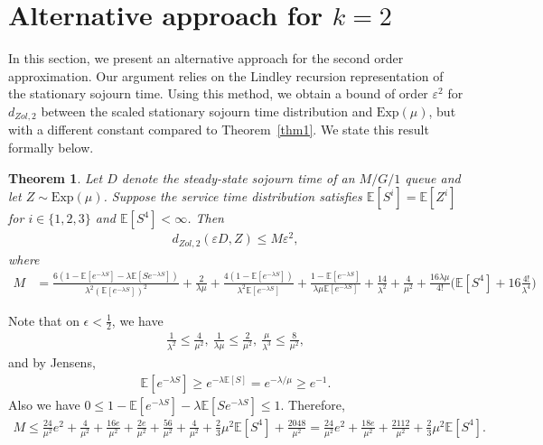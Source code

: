 \documentclass[11pt,letterpaper,reqno]{article}
\theoremstyle{thmstyleone}%
\newtheorem{theorem}{Theorem}%
\theoremstyle{thmstyletwo}%
\theoremstyle{thmstylethree}%
\numberwithin{equation}{section}
\begin{document}
\section{Alternative approach for  $k=2$}\label{sec:altk=2}
In this section, we present an alternative approach for the second order approximation. Our argument relies on the Lindley recursion representation of the stationary sojourn time.
Using this method, we obtain a bound of order $\varepsilon^2$ for $ d_{Zol,2}$ between the scaled stationary sojourn time distribution and $\mathrm{Exp}(\mu)$, but with a different constant compared to Theorem~\ref{thm1}. We state this result formally below.
\begin{theorem}\label{thm:alt}
Let $D$ denote the steady-state sojourn time of an $M/G/1$ queue and let $Z \sim \mathrm{Exp}(\mu)$. Suppose the service time distribution satisfies $\mathbb{E}[S^i] = \mathbb{E}[Z^i]$ for $i \in \{1,2,3\}$ and $\mathbb E[S^4] < \infty$. Then 
\begin{align*}   
    d_{Zol,2}(\varepsilon D,Z)\leq  M\varepsilon^2,
\end{align*}
where
\begin{align*}
    M&=\frac{6\left(1 - \mathbb E[e^{-\lambda S}] - \lambda \mathbb E[S e^{-\lambda S}]\right)}{\lambda^2 (\mathbb E[e^{-\lambda S}])^2}+\frac{2}{\lambda \mu} +\frac{4(1-\mathbb E[e^{-\lambda S}])}{\lambda^2\mathbb E[e^{-\lambda S}]}+\frac{1-\mathbb E[e^{-\lambda S}]}{\lambda\mu \mathbb E[e^{-\lambda S}]}+\frac{14}{\lambda^2}+\frac{4}{\mu^2}+\frac{16 \lambda \mu}{4!} \bigg(\mathbb E[S^4] +16\frac{4!}{\lambda^4}\bigg)
\end{align*}
\end{theorem}
Note that on  $\epsilon<\frac{1}{2}$, we have 
\begin{align*}
    \frac{1}{\lambda^2}\leq \frac{4}{\mu^2}, \ \frac{1}{\lambda \mu} \leq \frac{2}{\mu^2}, \ \frac{\mu}{\lambda^3} \leq \frac{8}{\mu^2},
\end{align*}
and by Jensens,
\begin{align*}
    \mathbb E[e^{-\lambda S}] \geq e^{-\lambda \mathbb E[S]}=e^{-\lambda/\mu} \geq e^{-1}.
\end{align*}
Also we have $0 \leq 1 - \mathbb E[e^{-\lambda S}] - \lambda \mathbb E[S e^{-\lambda S}] \leq 1$. Therefore,
\begin{align*}
    M \leq\frac{24}{\mu^2}e^2+\frac{4}{\mu^2}+\frac{16e}{\mu^2}+\frac{2e}{\mu^2}+\frac{56}{\mu^2}+\frac{4}{\mu^2}+\frac{2}{3}\mu^2 \mathbb E[S^4]+\frac{2048}{\mu^2}=\frac{24}{\mu^2}e^2+\frac{18e}{\mu^2}+\frac{2112}{\mu^2}+\frac{2}{3}\mu^2 \mathbb E[S^4].
\end{align*}
\end{document}
